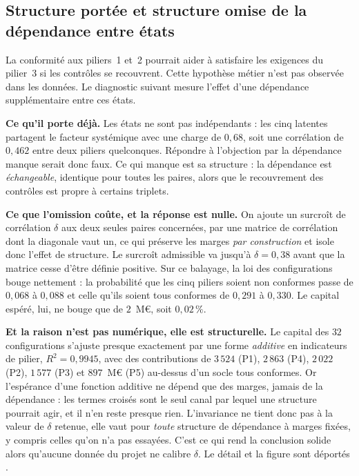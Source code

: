 \subsection{Structure portée et structure omise de la dépendance entre états}


La conformité aux piliers~1 et~2 pourrait aider à satisfaire les exigences du pilier~3 si les contrôles se recouvrent.
Cette hypothèse métier n'est pas observée dans les données.
Le diagnostic suivant mesure l'effet d'une dépendance supplémentaire entre ces états.

\textbf{Ce qu'il porte déjà.} Les états ne sont pas indépendants : les cinq latentes partagent le
facteur systémique avec une charge de $0{,}68$, soit une corrélation de $0{,}462$ entre deux
piliers quelconques. Répondre à l'objection par \og{}la dépendance manque\fg{} serait donc faux.
Ce qui manque est sa structure : la dépendance est \emph{échangeable}, identique pour
toutes les paires, alors que le recouvrement des contrôles est propre à certains triplets.

\textbf{Ce que l'omission coûte, et la réponse est nulle.} On ajoute un surcroît de corrélation
$\delta$ aux deux seules paires concernées, par une matrice de corrélation dont la diagonale
vaut un, ce qui préserve les marges \emph{par construction} et isole donc l'effet de structure.
Le surcroît admissible va jusqu'à $\delta = 0{,}38$ avant que la matrice cesse d'être définie
positive. Sur ce balayage, la loi des configurations bouge nettement : la probabilité que les
cinq piliers soient non conformes passe de $0{,}068$ à $0{,}088$ et celle qu'ils soient tous
conformes de $0{,}291$ à $0{,}330$. Le capital espéré, lui, ne bouge que de $2$~M\euro, soit
$0{,}02\,\%$.

\textbf{Et la raison n'est pas numérique, elle est structurelle.} Le capital des $32$
configurations s'ajuste presque exactement par une forme \emph{additive} en indicateurs de
pilier, $R^2 = 0{,}9945$, avec des contributions de $3\,524$ (P1), $2\,863$ (P4), $2\,022$ (P2),
$1\,577$ (P3) et $897$~M\euro{} (P5) au-dessus d'un socle tous conformes. Or l'espérance d'une
fonction additive ne dépend que des marges, jamais de la dépendance : les termes croisés
sont le seul canal par lequel une structure pourrait agir, et il n'en reste presque rien.
L'invariance ne tient donc pas à la valeur de $\delta$ retenue, elle vaut pour \emph{toute}
structure de dépendance à marges fixées, y compris celles qu'on n'a pas essayées. C'est ce qui
rend la conclusion solide alors qu'aucune donnée du projet ne calibre $\delta$. Le détail et la
figure sont déportés \matcomp.

